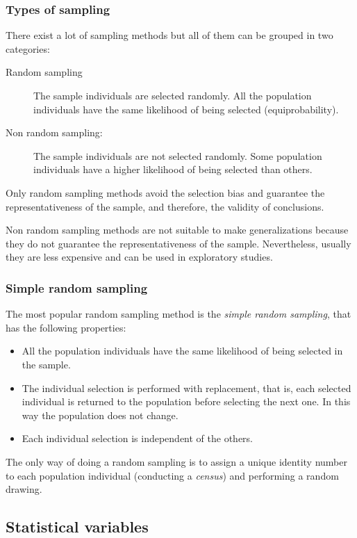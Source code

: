 \begin{frame}
\frametitle{Types of sampling}
There exist a lot of sampling methods but all of them can be grouped in two categories:
\begin{description}
\item[Random sampling] The sample individuals are selected randomly.
All the population individuals have the same likelihood of being selected (equiprobability).
\item[Non random sampling:] The sample individuals are not selected randomly.
Some population individuals have a higher likelihood of being selected than others.
\end{description}

Only random sampling methods avoid the selection bias and guarantee the representativeness of the sample, and therefore, the validity of conclusions.

Non random sampling methods are not suitable to make generalizations because they do not guarantee the representativeness of the sample.
Nevertheless, usually they are less expensive and can be used in exploratory studies.
\end{frame}



\begin{frame}
\frametitle{Simple random sampling}
The most popular random sampling method is the \emph{simple random sampling}, that has the following properties:
\begin{itemize}
\item All the population individuals have the same likelihood of being selected in the sample.
\item The individual selection is performed with replacement, that is, each selected individual is returned to the population before selecting the next one.
In this way the population does not change.
\item Each individual selection is independent of the others.
\end{itemize}

The only way of doing a random sampling is to assign a unique identity number to each population individual (conducting a \emph{census}) and performing a random drawing.
\end{frame}


\subsection{Statistical variables}

